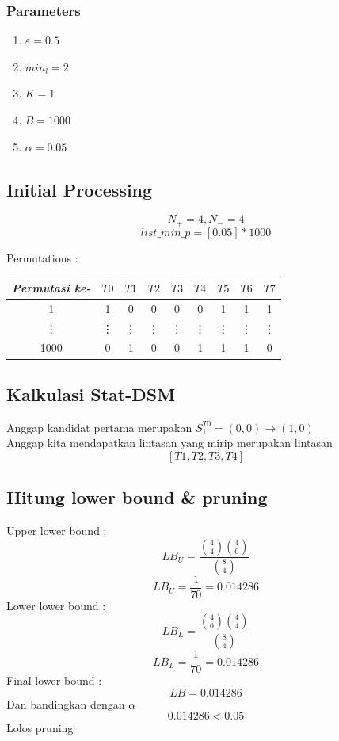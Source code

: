 \documentclass[a4paper,twoside]{article}
\begin{document}
\subsubsection{Parameters}
\begin{enumerate}
    \item $\varepsilon = 0.5$
    \item $min_l = 2$
    \item $K = 1$
    \item $B = 1000$
    \item $\alpha = 0.05$
\end{enumerate}

\subsection{Initial Processing}
\[ N_+ = 4, N_- = 4 \]
\[ list\_min\_p = [0.05] * 1000 \]

Permutations :
\begin{table}[H]
    \centering
    \begin{tabular}{ccccccccc}
        \toprule
        \textit{Permutasi ke-} & $T0$ & $T1$ & $T2$ & $T3$ & $T4$ & $T5$ & $T6$ & $T7$ \\
        \midrule
        1 & 1 & 0 & 0 & 0 & 0 & 1 & 1 & 1 \\
        \vdots & \vdots & \vdots & \vdots & \vdots & \vdots & \vdots & \vdots & \vdots \\
        1000 & 0 & 1 & 0 & 0 & 1 & 1 & 1 & 0 \\ \hline
    \end{tabular}
\end{table}

\subsection{Kalkulasi Stat-DSM}
Anggap kandidat pertama merupakan $S_1^{T0} = (0,0) \rightarrow (1,0)$ \\
Anggap kita mendapatkan lintasan yang mirip merupakan lintasan \[[T1, T2, T3, T4]\]

\subsection{Hitung lower bound \& pruning}
Upper lower bound :
\[ LB_U = \frac{\binom{4}{4} \binom{4}{0}}{\binom{8}{4}} \]
\[ LB_U = \frac{1}{70}=0.014286 \]
Lower lower bound :
\[ LB_L = \frac{\binom{4}{0} \binom{4}{4}}{\binom{8}{4}} \]
\[ LB_L = \frac{1}{70}=0.014286 \]
Final lower bound :
\[ LB = 0.014286 \]
Dan bandingkan dengan $\alpha$
\[ 0.014286 < 0.05 \]
Lolos pruning
\end{document}
